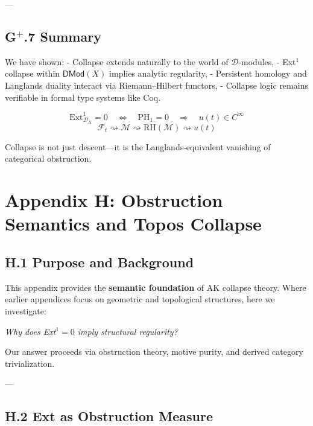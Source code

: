 \documentclass[11pt]{article}
\begin{document}
---

\subsection*{G$^+$.7 Summary}

We have shown:
- Collapse extends naturally to the world of $\mathcal{D}$-modules,
- Ext$^1$ collapse within $\mathsf{DMod}(X)$ implies analytic regularity,
- Persistent homology and Langlands duality interact via Riemann–Hilbert functors,
- Collapse logic remains verifiable in formal type systems like Coq.

\[
\boxed{
\mathrm{Ext}^1_{\mathcal{D}_X} = 0 \quad \Leftrightarrow \quad \mathrm{PH}_1 = 0 \quad \Rightarrow \quad u(t) \in C^\infty
}
\]
\[
\boxed{
\mathcal{F}_t \rightsquigarrow \mathcal{M} \rightsquigarrow \text{RH}(\mathcal{M}) \rightsquigarrow u(t)
}
\]

Collapse is not just descent—it is the Langlands-equivalent vanishing of categorical obstruction.




\section*{Appendix H: Obstruction Semantics and Topos Collapse}

\subsection*{H.1 Purpose and Background}

This appendix provides the \textbf{semantic foundation} of AK collapse theory.  
Where earlier appendices focus on geometric and topological structures, here we investigate:

\begin{center}
\textit{Why does Ext$^1 = 0$ imply structural regularity?}  
\end{center}

Our answer proceeds via obstruction theory, motive purity, and derived category trivialization.

---

\subsection*{H.2 Ext as Obstruction Measure}
\end{document}
